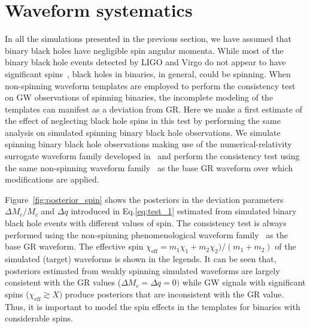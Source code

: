 \documentclass[prd,preprintnumbers,twocolumn,eqsecnum,floatfix,a4paper,nofootinbib,superscriptaddress]{revtex4}
\begin{document}
\section{Waveform systematics}
\label{sec:waveformsyst}

In all the simulations presented in the previous section, we have assumed that binary black holes have negligible spin angular momenta. While most of the binary black hole events detected by LIGO and Virgo do not appear to have significant spins~\cite{abbott2019gwtc}, black holes in binaries, in general, could be spinning. When non-spinning waveform templates are employed to perform the consistency test on GW observations of spinning binaries, the incomplete modeling of the templates can manifest as a deviation from GR. Here we make a first estimate of the effect of neglecting black hole spins in this test by performing the same analysis on simulated spinning binary black hole observations. We simulate spinning binary black hole observations making use of the numerical-relativity surrogate waveform family developed in~\cite{varma2019surrogate} and perform the consistency test using the same non-spinning waveform family~\cite{Mehta:2017jpq} as the base GR waveform over which modifications are applied. 

Figure~\ref{fig:posterior_spin} shows the posteriors in the deviation parameters $\Delta M_c/M_c$ and $\Delta q$ introduced in Eq.\eqref{eq:test_1} estimated from simulated binary black hole events with different values of spin. The consistency test is always performed using the non-spinning phenomenological waveform family~\cite{Mehta:2017jpq} as the base GR waveform. The effective spin $\chi_\mathrm{eff} = m_1 \chi_1 + m_2 \chi_2)/(m_1+m_2)$ of the simulated (target) waveforms is shown in the legends. It can be seen that, posteriors estimated from weakly spinning simulated waveforms are largely consistent with the GR values ($\Delta M_c = \Delta q = 0)$ while GW signals with significant spins ($\chi_\mathrm{eff} \gtrsim X)$ produce posteriors that are inconsistent with the GR value. Thus, it is important to model the spin effects in the templates for binaries with considerable spins. 
\end{document}
